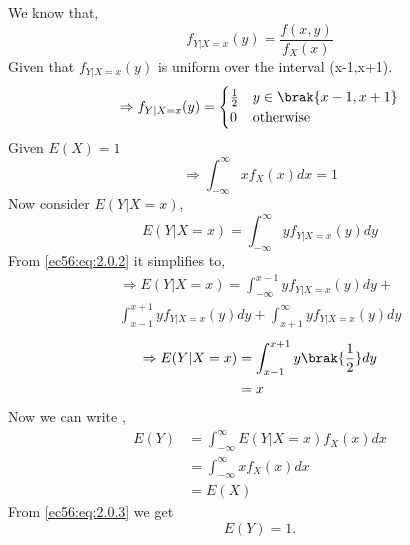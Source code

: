 We know that,
\begin{equation}
    f_{Y|X=x}(y)=\frac{f(x,y)}{f_{X}(x)} \label{ec56:eq:2.0.1}
\end{equation}
Given that $f_{Y|X=x}(y)$ is uniform over the interval (x-1,x+1).
\begin{equation}
    \Rightarrow f_{Y|X=x}(y)=
    \begin{cases}
    \frac{1}{2} & y \in \brak{x-1,x+1}\\
    0 & \text{otherwise}
    \end{cases}\label{ec56:eq:2.0.2}
\end{equation}
Given $E(X)=1$
\begin{equation}
    \Rightarrow \int_{-\infty}^{\infty}x f_{X}(x)dx=1 \label{ec56:eq:2.0.3}
\end{equation}
Now consider $E(Y|X=x)$,
\begin{equation}
    E(Y|X=x)=\int_{-\infty}^{\infty}yf_{Y|X=x}(y)dy
\end{equation}
From \eqref{ec56:eq:2.0.2} it simplifies to,
\begin{multline}
    \Rightarrow E(Y|X=x)=\int_{-\infty}^{x-1}yf_{Y|X=x}(y)dy+\\ \int_{x-1}^{x+1}yf_{Y|X=x}(y)dy+\int_{x+1}^{\infty}yf_{Y|X=x}(y)dy
\end{multline}
\begin{align}
    \Rightarrow E(Y|X=x)&=\int_{x-1}^{x+1}y\brak{\frac{1}{2}}dy\\
    &=x
\end{align}
Now we can write ,\\
\begin{align}
    E(Y)&=\int_{-\infty}^{\infty}E(Y|X=x)f_{X}(x)dx\\
    &=\int_{-\infty}^{\infty}xf_{X}(x)dx\\
    &=E(X)
\end{align}
From \eqref{ec56:eq:2.0.3} we get 
\begin{equation}
    E(Y)=1.
\end{equation}